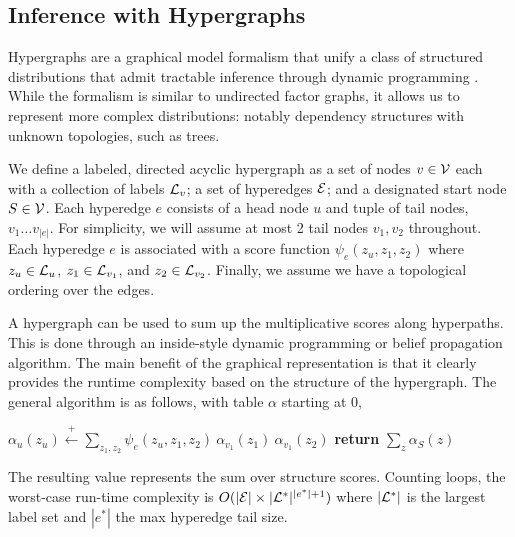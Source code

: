 \documentclass{article}
\begin{document}

\subsection{Inference with Hypergraphs}

Hypergraphs are a graphical model formalism that
unify a class of structured distributions that admit tractable
inference through dynamic programming \citep{klein2004parsing,huang2005better,zhou2006learning,javidian2020hypergraph,chiang2020factor}.
While the formalism is similar to undirected factor graphs,
it allows us to represent more complex distributions: notably
dependency structures with unknown topologies, such as trees.

We define a labeled, directed acyclic hypergraph as a set of nodes
$v \in \cal V$ each with a collection of labels ${\cal L}_v$; a set of
hyperedges $\cal E$; and a designated start node $S \in {\cal V}$. Each
hyperedge $e$ consists of a head node $u$ and tuple of tail nodes,
 $v_1 \ldots v_{|e|}$.
For simplicity, we will assume at most 2 tail nodes $v_1, v_2$ throughout.
Each hyperedge $e$
is associated with a score function $\psi_{e}(z_u, z_{1}, z_{2})$
where $z_u\in \mathcal{L}_u$, $z_{1} \in {\cal L}_{v_1}$,
and $z_{2} \in {\cal L}_{v_2}$.
Finally, we assume we have a topological ordering over the edges.

A hypergraph can be used to sum up the multiplicative scores along hyperpaths.
This is done through an inside-style dynamic programming or belief
propagation algorithm.
The main benefit of the graphical representation is that it clearly provides the
runtime complexity based on the structure of the hypergraph.
The general algorithm is as follows, with table $\alpha$ starting at 0, 
\begin{algorithm}
\begin{algorithmic} 
\STATE $\alpha_u(z_u) \stackrel{+}{\gets}  \displaystyle \sum_{z_1, z_2}  \psi_e(z_u, z_1, z_2) \  \alpha_{v_1}(z_1) \  \alpha_{v_1}(z_2)$
\ENDFOR
\ENDFOR
\STATE \textbf{return} $\sum_z \alpha_S(z)$
\end{algorithmic} 
\end{algorithm}

The resulting value represents the sum over structure scores. Counting
loops, the worst-case run-time complexity is
$O(|{\cal E}|\times |{\cal L}^*|^{|e^*|+1})$ where $|{\cal L}^*|$ is the 
largest label set and $|e^*|$ the max hyperedge tail size.
\end{document}
